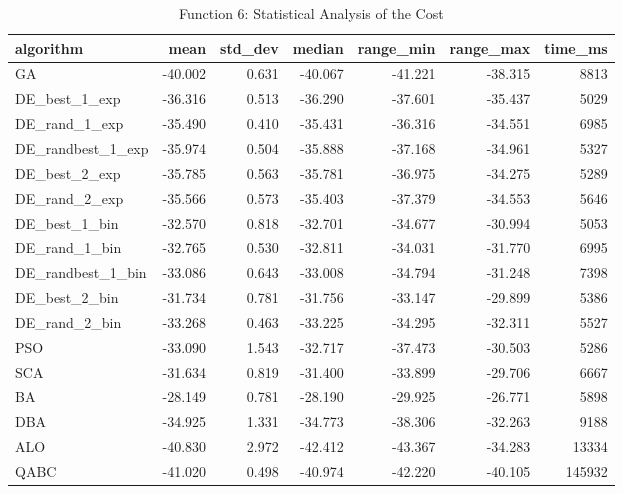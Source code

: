 \documentclass[12pt]{article}
\begin{document}
\begin{table}[H]
    \centering
    \footnotesize
    \begin{adjustbox}{width=1\textwidth}
\begin{tabular}{lrrrrrr}
\toprule
         algorithm &    mean &  std\_dev &  median &  range\_min &  range\_max &  time\_ms \\
\midrule
                GA & -40.002 &    0.631 & -40.067 &    -41.221 &    -38.315 &     8813 \\
     DE\_best\_1\_exp & -36.316 &    0.513 & -36.290 &    -37.601 &    -35.437 &     5029 \\
     DE\_rand\_1\_exp & -35.490 &    0.410 & -35.431 &    -36.316 &    -34.551 &     6985 \\
 DE\_randbest\_1\_exp & -35.974 &    0.504 & -35.888 &    -37.168 &    -34.961 &     5327 \\
     DE\_best\_2\_exp & -35.785 &    0.563 & -35.781 &    -36.975 &    -34.275 &     5289 \\
     DE\_rand\_2\_exp & -35.566 &    0.573 & -35.403 &    -37.379 &    -34.553 &     5646 \\
     DE\_best\_1\_bin & -32.570 &    0.818 & -32.701 &    -34.677 &    -30.994 &     5053 \\
     DE\_rand\_1\_bin & -32.765 &    0.530 & -32.811 &    -34.031 &    -31.770 &     6995 \\
 DE\_randbest\_1\_bin & -33.086 &    0.643 & -33.008 &    -34.794 &    -31.248 &     7398 \\
     DE\_best\_2\_bin & -31.734 &    0.781 & -31.756 &    -33.147 &    -29.899 &     5386 \\
     DE\_rand\_2\_bin & -33.268 &    0.463 & -33.225 &    -34.295 &    -32.311 &     5527 \\
               PSO & -33.090 &    1.543 & -32.717 &    -37.473 &    -30.503 &     5286 \\
               SCA & -31.634 &    0.819 & -31.400 &    -33.899 &    -29.706 &     6667 \\
                BA & -28.149 &    0.781 & -28.190 &    -29.925 &    -26.771 &     5898 \\
               DBA & -34.925 &    1.331 & -34.773 &    -38.306 &    -32.263 &     9188 \\
               ALO & -40.830 &    2.972 & -42.412 &    -43.367 &    -34.283 &    13334 \\
              QABC & -41.020 &    0.498 & -40.974 &    -42.220 &    -40.105 &   145932 \\
\bottomrule
\end{tabular}


    \end{adjustbox}
    \caption{Function 6: Statistical Analysis of the Cost} 
    \end{table}
\end{document}
